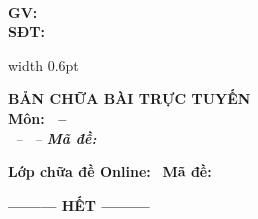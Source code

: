 \documentclass[11pt,a5paper]{article}
\begin{document}
\noindent
\begin{tcolorbox}[
    colback=blue!2!white,
    colframe=blue!80!black,
    arc=2.5mm,
    boxrule=0.8pt,
    left=4pt, right=4pt, top=4pt, bottom=4pt
]
\begin{minipage}[c]{0.46\linewidth}
\centering
{\bfseries\color{blue!85!black} \brandname}\\[2pt]
{\footnotesize\textbf{GV: \giaovien}}\\[1pt]
{\footnotesize\textbf{SĐT: \sdt}}
\end{minipage}%
\hfill
{\color{blue!60!black}\vrule width 0.6pt}%
\hfill
\begin{minipage}[c]{0.51\linewidth}
\centering
{\bfseries\color{red!85!black} BẢN CHỮA BÀI TRỰC TUYẾN}\\[1pt]
{\footnotesize\textbf{Môn: \monhoc\ifx\tentruong\empty\else\ -- \tentruong\fi}}\\[1pt]
{\scriptsize\textit{\tenkythi\ -- \namhoc\ -- \textbf{Mã đề: \made}}}
\end{minipage}

\vspace{2pt}
\tcbline
\vspace{1pt}
\noindent
\rule{0pt}{9pt}{\footnotesize\textbf{Lớp chữa đề Online:} \dotfill\ \textbf{Mã đề: \made}}
\end{tcolorbox}
\vspace{0.1cm}



\vspace{0.3cm}
\begin{center}
	\textbf{--------- HẾT ---------}
\end{center}
\end{document}
